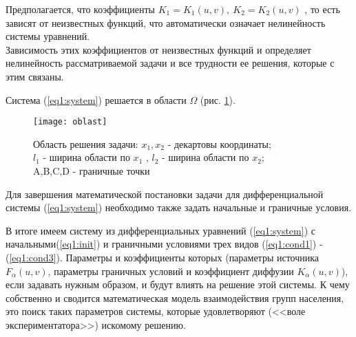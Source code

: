  Предполагается, что коэффициенты $K_{1} = K_{1}(u,v),\ K_{2} = K_{2}(u,v)$ , то есть зависят от неизвестных функций, что автоматически означает нелинейность системы уравнений.\\ Зависимость этих коэффициентов от неизвестных функций и определяет нелинейность рассматриваемой задачи и все трудности ее решения, которые с этим связаны.

Система (\ref{eq1:system}) решается в области $\Omega$ (рис. \ref{fig:omega}).

\begin{figure}[ht!]
    \centering
    \texttt{[image: oblast]}
    \captionsetup{justification=centering,margin=2cm}
    \caption{Область решения задачи: $x_{1},x_{2}$ - декартовы координаты;\\ $l_{1}$ - ширина области по $x_{1}$ , $l_{2}$ - ширина области по $x_{2}$;\\ A,B,C,D - граничные точки}
    \label{fig:omega}
\end{figure}

Для завершения математической постановки задачи для дифференциальной системы (\ref{eq1:system}) необходимо также задать начальные и граничные условия.





В итоге имеем систему из дифференциальных уравнений (\ref{eq1:system}) с начальными(\ref{eq1:init})  и граничными условиями трех видов (\ref{eq1:cond1}) - (\ref{eq1:cond3}). Параметры и коэффициенты которых  (параметры источника $F_{\alpha}(u,v)$, параметры граничных условий и коэффициент диффузии $K_{\alpha}(u,v)$), если задавать нужным образом, и будут влиять на решение этой системы. К чему собственно и сводится математическая модель взаимодействия групп населения, это поиск таких параметров системы, которые удовлетворяют (<<воле экспериментатора>>) искомому решению.